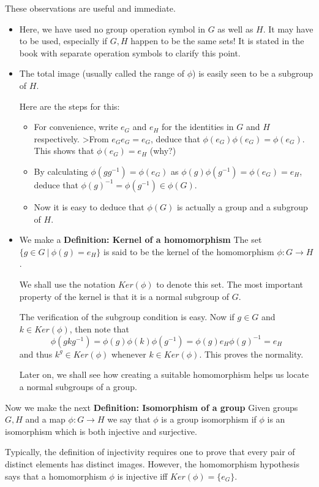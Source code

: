 \documentclass[12pt]{article}
\newcommand{\deff}[1]{{\bf Definition: #1} }
\begin{document}
These observations are useful and immediate.
\begin{itemize}
\item Here, we have used no group operation symbol in $G$ as well as
$H$. It may have to be used, especially if $G,H$ happen to be the same
sets!
It is stated in the book with separate operation symbols to clarify this
point.

\item The total image (usually called the range of $\phi$) is easily 
seen to be a subgroup of $H$.

Here are the steps for this:
\begin{itemize}
\item For convenience, write $e_G$ and $e_H$ for the identities in $G$
and $H$ respectively.
>From $e_Ge_G=e_G$, deduce that $\phi(e_G)\phi(e_G)=\phi(e_G)$. This
shows that $\phi(e_G)=e_H$ (why?)
\item By calculating $\phi(gg^{-1})=\phi(e_G)$ as
$\phi(g)\phi(g^{-1})=\phi(e_G)=e_H$, deduce that
$\phi(g)^{-1}=\phi(g^{-1})\in \phi(G)$.

\item Now it is easy to deduce that $\phi(G)$ is actually a group and a
subgroup of $H$.
\end{itemize}
\item We make a
\deff{Kernel of a homomorphism}
The set $\{g\in G ~|~ \phi(g)=e_H\}$ is
said to be the kernel of the homomorphism $\phi:G\rightarrow H$.

We shall use the notation $Ker(\phi)$ to denote this set.
The most important property of the kernel is that it is a normal
subgroup of $G$.

The verification of the subgroup condition is easy. Now if $g\in G$ and
$k\in Ker(\phi)$, then note that
$$\phi(gkg^{-1}) =
\phi(g)\phi(k)\phi(g^{-1}) = \phi(g)e_H\phi(g)^{-1}=e_H$$
and thus $k^g\in Ker(\phi)$ whenever $k\in Ker(\phi)$.
This proves the normality.

Later on, we shall see how creating a suitable homomorphism
helps us locate a
normal subgroups of a group.

\end{itemize}

Now we make the next \deff{Isomorphism of a
group}
Given groups $G,H$ and a map $\phi :G\rightarrow H$ we say that $\phi$ is a
group isomorphism if $\phi$ is an isomorphism which is both injective and surjective.

Typically, the definition of injectivity requires one to prove that
every pair of distinct elements has distinct images. However, the
homomorphism hypothesis says that a homomorphism $\phi$ is injective iff
$Ker(\phi)=\{e_G\}$.
\end{document}
